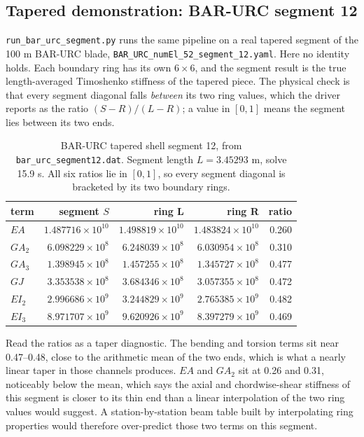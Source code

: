 \subsection{Tapered demonstration: BAR-URC segment 12}

\texttt{run\_bar\_urc\_segment.py} runs the same pipeline on a real tapered
segment of the 100 m BAR-URC blade,
\texttt{BAR\_URC\_numEl\_52\_segment\_12.yaml}. Here no identity holds. Each
boundary ring has its own $6\times6$, and the segment result is the true
length-averaged Timoshenko stiffness of the tapered piece. The physical check is
that every segment diagonal falls \emph{between} its two ring values, which the
driver reports as the ratio $(S-R)/(L-R)$; a value in $[0,1]$ means the segment
lies between its two ends.

\begin{table}[htbp]
\centering
\small
\begin{tabular}{lrrrr}
\toprule
term & segment $S$ & ring L & ring R & ratio \\
\midrule
$EA$   & $1.487716\times10^{10}$ & $1.498819\times10^{10}$ & $1.483824\times10^{10}$ & 0.260 \\
$GA_2$ & $6.098229\times10^{8}$  & $6.248039\times10^{8}$  & $6.030954\times10^{8}$  & 0.310 \\
$GA_3$ & $1.398945\times10^{8}$  & $1.457255\times10^{8}$  & $1.345727\times10^{8}$  & 0.477 \\
$GJ$   & $3.353538\times10^{8}$  & $3.684346\times10^{8}$  & $3.057355\times10^{8}$  & 0.472 \\
$EI_2$ & $2.996686\times10^{9}$  & $3.244829\times10^{9}$  & $2.765385\times10^{9}$  & 0.482 \\
$EI_3$ & $8.971707\times10^{9}$  & $9.620926\times10^{9}$  & $8.397279\times10^{9}$  & 0.469 \\
\bottomrule
\end{tabular}
\caption{BAR-URC tapered shell segment 12, from \texttt{bar\_urc\_segment12.dat}.
Segment length $L = 3.45293$ m, solve 15.9 s. All six ratios lie in $[0,1]$, so
every segment diagonal is bracketed by its two boundary rings.}
\label{tab:seg-bar-urc}
\end{table}

Read the ratios as a taper diagnostic. The bending and torsion terms sit near
0.47--0.48, close to the arithmetic mean of the two ends, which is what a nearly
linear taper in those channels produces. $EA$ and $GA_2$ sit at 0.26 and 0.31,
noticeably below the mean, which says the axial and chordwise-shear stiffness of
this segment is closer to its thin end than a linear interpolation of the two
ring values would suggest. A station-by-station beam table built by interpolating
ring properties would therefore over-predict those two terms on this segment.


